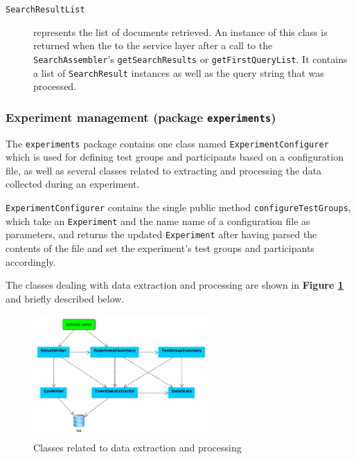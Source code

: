 \documentclass[a4paper]{usiinfbachelorproject}
\begin{document}
\begin{description}
    \item[\texttt{SearchResultList}] represents the list of documents retrieved. An instance of this
            class is returned when the to the service layer after a call to the \texttt{SearchAssembler}'s
            \texttt{getSearchResults} or \texttt{getFirstQueryList}. It contains a list of 
            \texttt{SearchResult} instances as well as  the query string that was processed.

\end{description}


\subsubsection{\textbf{Experiment management (package \texttt{experiments})}} \label{sec:archDataLayerExperiments}

The \texttt{experiments} package contains one class named \texttt{ExperimentConfigurer} which is used for defining
test groups and participants based on a configuration file, as well as several classes related to extracting and processing
the data collected during an experiment.

\texttt{ExperimentConfigurer} contains the single public method \texttt{configureTestGroups}, which take an 
\texttt{Experiment} and the name name of a configuration file as parameters, and returns the updated \texttt{Experiment}
after having parsed the contents of the file and set the experiment's test groups and participants accordingly.

The classes dealing with data extraction and processing are shown in \textbf{Figure \ref{fig:dataExtractionClasses}} and briefly described below.    

\begin{figure}[h!]
\centering
\includegraphics[width=0.6\textwidth]{figures/dataExtractionClasses}
\caption{Classes related to data extraction and processing}
\label{fig:dataExtractionClasses}
\end{figure}
\end{document}
